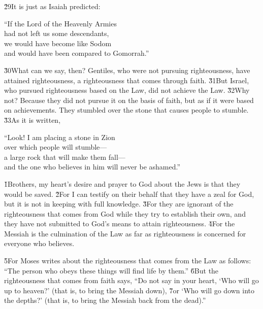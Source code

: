 \v{29}It is just as Isaiah predicted:

\begin{poetry}
\poeml ``If the Lord of the Heavenly Armies \\
\poemll    had not left us some descendants, \\
\poemlll       we would have become like Sodom \\
\poemlll       and would have been compared to Gomorrah.''
\end{poetry}

\v{30}What can we say, then? Gentiles, who were not pursuing righteousness, have attained righteousness, a righteousness that comes through faith. \v{31}But Israel, who pursued righteousness based on the Law, did not achieve the Law. \v{32}Why not? Because they did not pursue it on the basis of faith, but as if it were based on achievements. They stumbled over the stone that causes people to stumble. \v{33}As it is written,

\begin{poetry}
\poeml ``Look! I am placing a stone in Zion \\
\poemll    over which people will stumble--- \\
\poeml a large rock that will make them fall--- \\
\poemll    and the one who believes in him will never be ashamed.''
\end{poetry}

\v{1}Brothers, my heart's desire and prayer to God about the Jews is that they would be saved. \v{2}For I can testify on their behalf that they have a zeal for God, but it is not in keeping with full knowledge. \v{3}For they are ignorant of the righteousness that comes from God while they try to establish their own, and they have not submitted to God's means to attain righteousness. \v{4}For the Messiah is the culmination of the Law as far as righteousness is concerned for everyone who believes.

\v{5}For Moses writes about the righteousness that comes from the Law as follows: ``The person who obeys these things will find life by them.'' \v{6}But the righteousness that comes from faith says, ``Do not say in your heart, `Who will go up to heaven?' (that is, to bring the Messiah down), \v{7}or `Who will go down into the depths?' (that is, to bring the Messiah back from the dead).''

